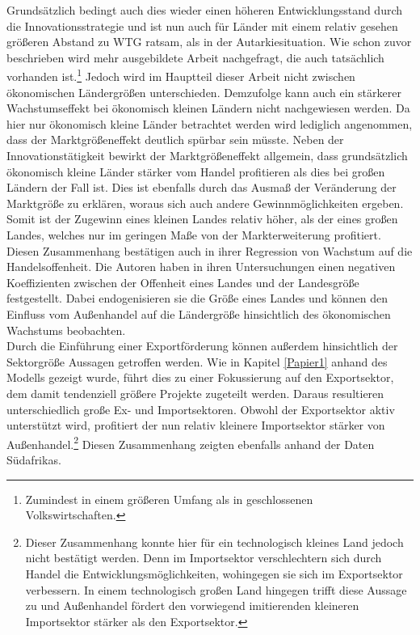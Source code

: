 %
Grundsätzlich bedingt auch dies wieder einen höheren Entwicklungsstand durch die Innovationsstrategie und ist nun auch für Länder mit einem relativ gesehen größeren Abstand zu WTG ratsam, als in der Autarkiesituation. Wie schon zuvor beschrieben wird mehr ausgebildete Arbeit nachgefragt, die auch tatsächlich vorhanden ist.\footnote{Zumindest in einem größeren Umfang als in geschlossenen Volkswirtschaften.} Jedoch wird im Hauptteil dieser Arbeit nicht zwischen ökonomischen Ländergrößen unterschieden. Demzufolge kann auch ein stärkerer Wachstumseffekt bei ökonomisch kleinen Ländern nicht nachgewiesen werden. Da hier nur ökonomisch kleine Länder betrachtet werden wird lediglich angenommen, dass der Marktgrößeneffekt deutlich spürbar sein müsste. Neben der Innovationstätigkeit bewirkt der Marktgrößeneffekt allgemein, dass grundsätzlich ökonomisch kleine Länder stärker  vom Handel profitieren als dies bei großen Ländern der Fall ist. Dies ist ebenfalls durch das Ausmaß der Veränderung der Marktgröße zu erklären, woraus sich auch andere Gewinnmöglichkeiten ergeben. Somit ist der Zugewinn eines kleinen Landes relativ höher, als der eines großen Landes, welches nur im geringen Maße von der Markt\-erweiterung profitiert. \\
%
Diesen Zusammenhang bestätigen auch \cite{Alesina.2005} in ihrer Regression von Wachstum auf die Handelsoffenheit. Die Autoren haben in ihren Untersuchungen einen negativen Koeffizienten zwischen der Offenheit eines Landes und der Landesgröße festgestellt. Dabei endogenisieren sie die Größe eines Landes und können den Einfluss vom Außenhandel auf die Ländergröße hinsichtlich des ökonomischen Wachstums beobachten.\\
%
Durch die Einführung einer Exportförderung können außerdem hinsichtlich der Sektorgröße Aussagen getroffen werden. Wie in Kapitel \ref{Papier1} anhand des Modells gezeigt wurde, führt dies zu einer Fokussierung auf den Exportsektor, dem damit tendenziell größere Projekte zugeteilt werden. Daraus resultieren unterschiedlich große Ex- und Importsektoren. Obwohl der Exportsektor aktiv unterstützt wird, profitiert der nun relativ kleinere Importsektor stärker von Außenhandel.\footnote{Dieser Zusammenhang konnte hier für ein technologisch kleines Land jedoch nicht bestätigt werden. Denn im Importsektor verschlechtern sich durch Handel die Entwicklungsmöglichkeiten, wohingegen sie sich im Exportsektor verbessern. In einem technologisch großen Land hingegen trifft diese Aussage zu und Außenhandel fördert den vorwiegend imitierenden kleineren Importsektor stärker als den Exportsektor.} Diesen Zusammenhang zeigten ebenfalls \cite{Aghion.2013} anhand der Daten Südafrikas. 
